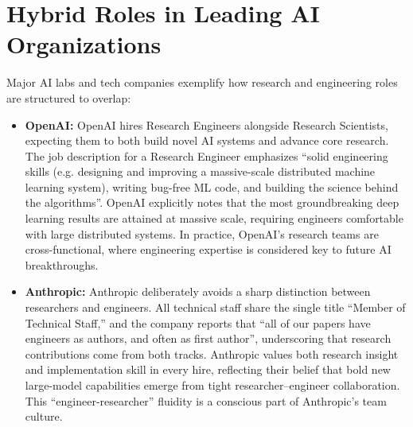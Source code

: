 \documentclass[pdflatex,sn-mathphys-num]{sn-jnl}%
\theoremstyle{thmstyleone}%
\theoremstyle{thmstyletwo}%
\theoremstyle{thmstylethree}%
\begin{document}
\section{Hybrid Roles in Leading AI Organizations}
Major AI labs and tech companies exemplify how research and engineering roles are structured to overlap:
\begin{itemize}
\item \textbf{OpenAI:} OpenAI hires Research Engineers alongside Research Scientists, expecting them to both build novel AI systems and advance core research. The job description for a Research Engineer emphasizes “solid engineering skills (e.g. designing and improving a massive-scale distributed machine learning system), writing bug-free ML code, and building the science behind the algorithms”\cite{OpenAI-RE-Job}. OpenAI explicitly notes that the most groundbreaking deep learning results are attained at massive scale, requiring engineers comfortable with large distributed systems\cite{OpenAI-RE-Job}. In practice, OpenAI’s research teams are cross-functional, where engineering expertise is considered key to future AI breakthroughs. 

\item \textbf{Anthropic:} Anthropic deliberately avoids a sharp distinction between researchers and engineers. All technical staff share the single title “Member of Technical Staff,” and the company reports that “all of our papers have engineers as authors, and often as first author”\cite{AnthropicCareers2023}, underscoring that research contributions come from both tracks. Anthropic values both research insight and implementation skill in every hire, reflecting their belief that bold new large-model capabilities emerge from tight researcher–engineer collaboration. This “engineer-researcher” fluidity is a conscious part of Anthropic’s team culture\cite{AnthropicCareers2023}. 

\begin{figure}[t]
  \centering
  \begin{minipage}{1.0\linewidth}
    \centering
{}
\end{minipage}
\end{figure}
\end{itemize}
\end{document}
